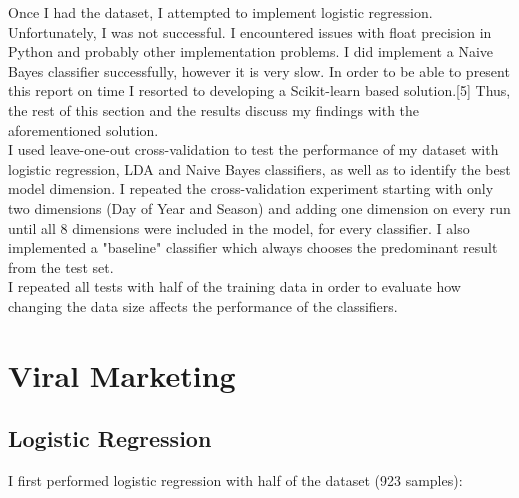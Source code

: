 \documentclass[conference,letterpaper]{IEEEtran}
\begin{document}
\indent Once I had the dataset, I attempted to implement logistic regression. Unfortunately, I was not successful. I encountered
issues with float precision in Python and probably other implementation problems. I did implement a Naive Bayes classifier
successfully, however it is very slow.  In order to be able to present this report on time I resorted to developing 
a Scikit-learn based solution.[5] Thus, the rest of this section and the results discuss my findings with the aforementioned solution. \\
\indent I used leave-one-out cross-validation to test the performance of my dataset with logistic regression, LDA and Naive Bayes
classifiers, as well as to identify the best model dimension. I repeated the cross-validation experiment starting with only two
dimensions (Day of Year and Season) and adding one dimension on every run until all 8 dimensions were included in the model, for
every classifier. I also implemented a "baseline" classifier which always chooses the predominant result from the test set. \\
\indent I repeated all tests with half of the training data in order to evaluate how changing the data size affects the
performance of the classifiers. \\

\section{Viral Marketing}


\subsection{Logistic Regression}
I first performed logistic regression with half of the dataset (923 samples):
\end{document}
